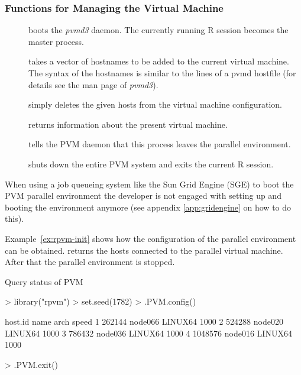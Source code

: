\subsubsection{Functions for Managing the Virtual Machine}
\begin{description}
\item[] boots the \textit{pvmd3} daemon. The
  currently running R session becomes the master process. 
\item[] takes a vector of hostnames to
  be added to the current virtual machine. The syntax of the
  hostnames is similar to the lines of a pvmd hostfile (for details
  see the man page of \textit{pvmd3}). 
\item[] simply deletes the given hosts from
  the virtual machine configuration.
\item[] returns information about the present
  virtual machine.
\item[] tells the PVM daemon that this process
  leaves the parallel environment.
\item[] shuts down the entire PVM system and exits
  the current R session.
\end{description}
  
When using a job queueing system like the Sun Grid Engine (SGE) to boot
the PVM parallel environment the developer is not engaged with
setting up and booting the environment anymore (see
appendix \ref{app:gridengine} on how to do this).

Example~\ref{ex:rpvm-init} shows how the configuration of the parallel
environment can be obtained.  returns the hosts
connected to 
the parallel virtual machine. After that the
parallel environment is stopped. 
\begin{Example} Query status of PVM 
\label{ex:rpvm-init}
\begin{Schunk}
\begin{Sinput}
> library("rpvm")
> set.seed(1782)
> .PVM.config()
\end{Sinput}
\begin{Soutput}
  host.id    name    arch speed
1  262144 node066 LINUX64  1000
2  524288 node020 LINUX64  1000
3  786432 node036 LINUX64  1000
4 1048576 node016 LINUX64  1000
\end{Soutput}
\begin{Sinput}
> .PVM.exit()
\end{Sinput}
\end{Schunk}
\end{Example}

